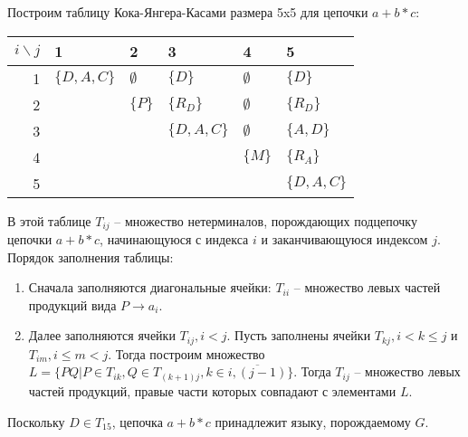 \documentclass[11pt]{article}
\begin{document}
Построим таблицу Кока-Янгера-Касами размера 5x5 для цепочки \(a+b*c\):
\begin{center}
\begin{tabular}{rlllll}
\hline
\(i\backslash j\) & 1 & 2 & 3 & 4 & 5\\
\hline
1 & \(\{D, A, C\}\) & \(\emptyset\) & \(\{D\}\) & \(\emptyset\) & \(\{D\}\)\\
2 &  & \(\{P\}\) & \(\{R_D\}\) & \(\emptyset\) & \(\{R_D\}\)\\
3 &  &  & \(\{D, A, C\}\) & \(\emptyset\) & \(\{A, D\}\)\\
4 &  &  &  & \(\{M\}\) & \(\{R_A\}\)\\
5 &  &  &  &  & \(\{D, A, C\}\)\\
\hline
\end{tabular}
\end{center}
В этой таблице \(T_{ij}\) -- множество нетерминалов, порождающих подцепочку цепочки \(a+b*c\),
начинающуюся с индекса \(i\) и заканчивающуюся индексом \(j\). Порядок заполнения таблицы:
\begin{enumerate}
\item Сначала заполняются диагональные ячейки: \(T_{ii}\) -- множество левых частей продукций вида \(P \rightarrow a_i\).
\item Далее заполняются ячейки \(T_{ij}, i < j\). Пусть заполнены ячейки \(T_{kj}, i < k \leq j\) и \(T_{im}, i \leq m < j\). Тогда построим множество \(L = \{PQ | P \in T_{ik}, Q \in T_{(k + 1)j}, k \in \overline{i, (j - 1)}\}\). Тогда \(T_{ij}\) -- множество левых частей продукций, правые части которых совпадают с элементами \(L\).
\end{enumerate}

Поскольку \(D \in T_{15}\), цепочка \(a+b*c\) принадлежит языку, порождаемому \(G\).
\end{document}
